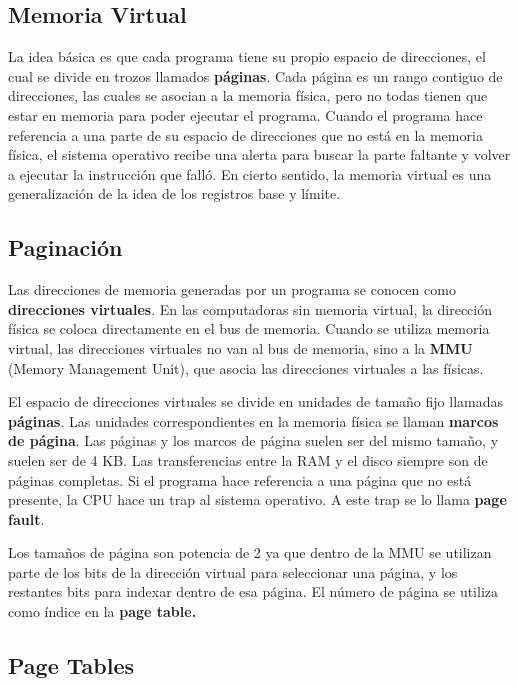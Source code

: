 \subsection{Memoria Virtual}

La idea básica es que cada programa tiene su propio espacio de direcciones, el cual se divide en trozos llamados \textbf{páginas}. Cada página es un rango contiguo de direcciones, las cuales se asocian a la memoria física, pero no todas tienen que estar en memoria para poder ejecutar el programa. Cuando el programa hace referencia a una parte de su espacio de direcciones que no está en la memoria física, el sistema operativo recibe una alerta para buscar la parte faltante y volver a ejecutar la instrucción que falló. En cierto sentido, la memoria virtual es una generalización de la idea de los registros base y límite.

\subsection{Paginación}

Las direcciones de memoria generadas por un programa se conocen como \textbf{direcciones virtuales}. En las computadoras sin memoria virtual, la dirección física se coloca directamente en el bus de memoria. Cuando se utiliza memoria virtual, las direcciones virtuales no van al bus de memoria, sino a la \textbf{MMU} (Memory Management Unit), que asocia las direcciones virtuales a las físicas.

El espacio de direcciones virtuales se divide en unidades de tamaño fijo llamadas \textbf{páginas}. Las unidades correspondientes en la memoria física se llaman \textbf{marcos de página}. Las páginas y los marcos de página suelen ser del mismo tamaño, y suelen ser de 4 KB. Las transferencias entre la RAM y el disco siempre son de páginas completas. Si el programa hace referencia a una página que no está presente, la CPU hace un trap al sistema operativo. A este trap se lo llama \textbf{page fault}.

Los tamaños de página son potencia de 2 ya que dentro de la MMU se utilizan parte de los bits de la dirección virtual para seleccionar una página, y los restantes bits para indexar dentro de esa página. El número de página se utiliza como índice en la \textbf{page table.}

\subsection{Page Tables}

